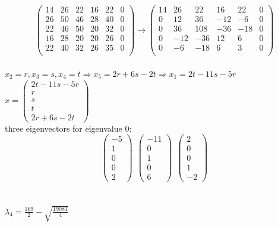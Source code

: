 \documentclass[a4paper,10pt]{article}
\begin{document}
\[\left( \begin{array}{ccccc|c}
14 & 26 & 22 & 16 & 22 & 0 \\
26 & 50 & 46 & 28 & 40 & 0\\
22 & 46 & 50 & 20 & 32 & 0\\
16 & 28 & 20 & 20 & 26 & 0\\
22 & 40 & 32 & 26 & 35 & 0\\
\end{array} \right)
\rightarrow
\left( \begin{array}{ccccc|c}
14 & 26 & 22 & 16 & 22 & 0 \\
0 & 12 & 36 & -12 & -6 & 0\\
0 & 36 & 108 & -36 & -18 & 0\\
0 & -12 & -36 & 12 & 6 & 0\\
0 & -6 & -18 & 6 & 3 & 0\\
\end{array} \right) 
 \] \\
 $x_2=r,x_3=s,x_4=t \Rightarrow x_5 =2r+6s-2t \Rightarrow x_1=2t-11s-5r$ \\
 $x=\left(
\begin{array}{c}
2t-11s-5r\\
r\\
s\\
t\\
2r+6s-2t
\end{array}
\right)$ \\
 three eigenvectors for eigenvalue 0:\\
\[ \left(
\begin{array}{c}
-5\\
1\\
0\\
0\\
2
\end{array}
\right) \ \ \left(
\begin{array}{c}
-11\\
0\\
1\\
0\\
6
\end{array}
\right) \ \ \left(
\begin{array}{c}
2\\
0\\
0\\
1\\
-2
\end{array}
\right)  \]  \\ \\
$\lambda_{4}=\frac{169}{2} - \sqrt{\frac{19081}{4}} $ \\
\end{document}
